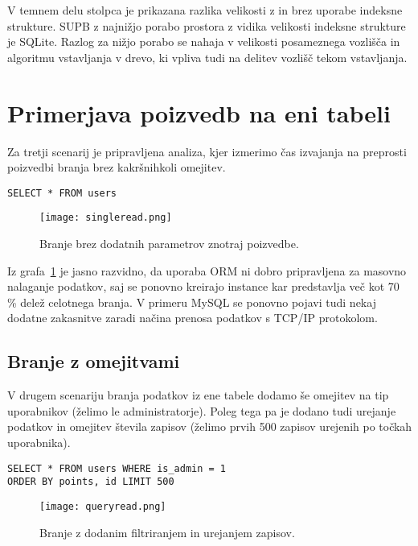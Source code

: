 \documentclass[a4paper,12pt,openright]{book}
\begin{document}
    V temnem delu stolpca je prikazana razlika velikosti z in brez uporabe indeksne strukture. SUPB z najnižjo porabo prostora z vidika velikosti indeksne strukture je SQLite. Razlog za nižjo porabo se nahaja v velikosti posameznega vozlišča in algoritmu vstavljanja v drevo, ki vpliva tudi na delitev vozlišč tekom vstavljanja.

    \section{Primerjava poizvedb na eni tabeli}

    Za tretji scenarij je pripravljena analiza, kjer izmerimo čas izvajanja na preprosti poizvedbi branja brez kakršnihkoli omejitev.
    
\begin{verbatim}
SELECT * FROM users
\end{verbatim}
    

    \begin{figure}[H]
        \centerline{\texttt{[image: singleread.png]}}
        \caption{Branje brez dodatnih parametrov znotraj poizvedbe.}
        \label{branje}
    \end{figure}

    \noindent
    Iz grafa~\ref{branje} je jasno razvidno, da uporaba ORM ni dobro pripravljena za masovno nalaganje podatkov, saj se ponovno kreirajo instance kar predstavlja več kot 70 \% delež celotnega branja. V primeru MySQL se ponovno pojavi tudi nekaj dodatne zakasnitve zaradi načina prenosa podatkov s TCP/IP protokolom.

    \subsection{Branje z omejitvami}

    V drugem scenariju branja podatkov iz ene tabele dodamo še omejitev na tip uporabnikov (želimo le administratorje). Poleg tega pa je dodano tudi urejanje podatkov in omejitev števila zapisov (želimo prvih 500 zapisov urejenih po točkah uporabnika).

\begin{verbatim}
SELECT * FROM users WHERE is_admin = 1
ORDER BY points, id LIMIT 500
\end{verbatim}
    
    \begin{figure}[H]
        \centerline{\texttt{[image: queryread.png]}}
        \caption{Branje z dodanim filtriranjem in urejanjem zapisov.}
        \label{queryread}
    \end{figure}
\end{document}
